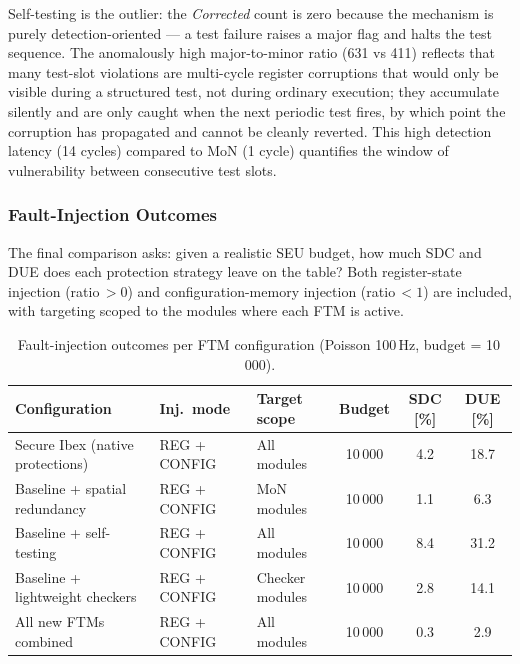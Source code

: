 Self-testing is the outlier: the \textit{Corrected} count is zero because the mechanism is
purely detection-oriented — a test failure raises a major flag and halts the test sequence.
The anomalously high major-to-minor ratio (631 vs 411) reflects that many test-slot violations
are multi-cycle register corruptions that would only be visible during a structured test, not
during ordinary execution; they accumulate silently and are only caught when the next periodic
test fires, by which point the corruption has propagated and cannot be cleanly reverted.
This high detection latency (14 cycles) compared to MoN (1 cycle) quantifies the window of
vulnerability between consecutive test slots.

\subsubsection{Fault-Injection Outcomes}
\label{sec:fi_outcomes_results}

The final comparison asks: given a realistic \ac{SEU} budget, how much \ac{SDC} and \ac{DUE}
does each protection strategy leave on the table? Both register-state injection (ratio\,$>0$)
and configuration-memory injection (ratio\,$<1$) are included, with targeting scoped to the
modules where each \ac{FTM} is active.

\begin{table}[H]
\centering
\caption{Fault-injection outcomes per \ac{FTM} configuration (Poisson 100\,Hz, budget = 10\,000).}
\label{tab:fi_outcomes_results}
\footnotesize
\begin{tabularx}{\textwidth}{l l l c c c}
\toprule
\textbf{Configuration} & \textbf{Inj.\ mode} & \textbf{Target scope}
  & \textbf{Budget} & \textbf{SDC [\%]} & \textbf{DUE [\%]} \\
\midrule
Secure Ibex (native protections) & REG + CONFIG & All modules     & 10\,000 & 4.2 & 18.7 \\
Baseline + spatial redundancy    & REG + CONFIG & MoN modules     & 10\,000 & 1.1 &  6.3 \\
Baseline + self-testing          & REG + CONFIG & All modules     & 10\,000 & 8.4 & 31.2 \\
Baseline + lightweight checkers  & REG + CONFIG & Checker modules & 10\,000 & 2.8 & 14.1 \\
All new \acp{FTM} combined       & REG + CONFIG & All modules     & 10\,000 & 0.3 &  2.9 \\
\bottomrule
\end{tabularx}
\end{table}

